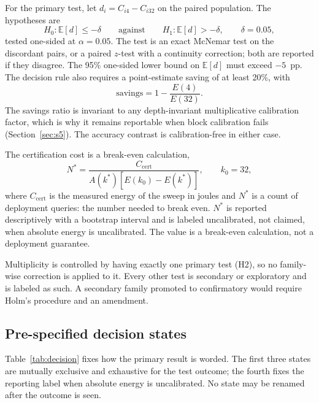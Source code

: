 \documentclass[a4paper,fleqn]{cas-sc}
\begin{document}
For the primary test, let $d_i=C_{i4}-C_{i32}$ on the paired population. The hypotheses are
\begin{equation}
H_0:\mathbb{E}[d]\le-\delta
\qquad\text{against}\qquad
H_1:\mathbb{E}[d]>-\delta,
\qquad \delta=0.05,
\label{eq:ni}
\end{equation}
tested one-sided at $\alpha=0.05$. The test is an exact McNemar test on the discordant pairs, or
a paired $z$-test with a continuity correction; both are reported if they disagree. The 95\%
one-sided lower bound on $\mathbb{E}[d]$ must exceed $-5$~pp. The decision rule also requires a
point-estimate saving of at least 20\%, with
\begin{equation}
\mathrm{savings}=1-\frac{E(4)}{E(32)}.
\label{eq:savings}
\end{equation}
The savings ratio is invariant to any depth-invariant multiplicative calibration factor, which
is why it remains reportable when block calibration fails (Section~\ref{sec:s5}). The accuracy
contrast is calibration-free in either case.

The certification cost is a break-even calculation,
\begin{equation}
N^{*}=\frac{C_{\mathrm{cert}}}{A(k^{*})\left[E(k_0)-E(k^{*})\right]},
\qquad k_0=32,
\label{eq:nstar}
\end{equation}
where $C_{\mathrm{cert}}$ is the measured energy of the sweep in joules and $N^{*}$ is a count of
deployment queries: the number needed to break even. $N^{*}$ is reported descriptively with a
bootstrap interval and is labeled uncalibrated, not claimed, when absolute energy is
uncalibrated. The value is a break-even calculation, not a deployment guarantee.

Multiplicity is controlled by having exactly one primary test (H2), so no family-wise correction
is applied to it. Every other test is secondary or exploratory and is labeled as such. A
secondary family promoted to confirmatory would require Holm's procedure and an amendment.

\subsection{Pre-specified decision states}

Table~\ref{tab:decision} fixes how the primary result is worded. The first three states are
mutually exclusive and exhaustive for the test outcome; the fourth fixes the reporting label
when absolute energy is uncalibrated. No state may be renamed after the outcome is seen.
\end{document}
